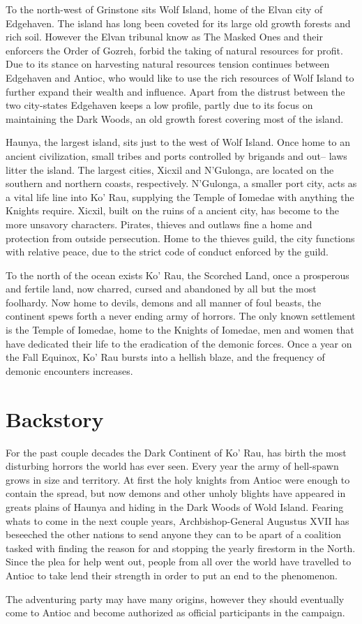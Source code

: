 To the north-west of Grinstone sits Wolf Island, home of the Elvan city of 
Edgehaven. The island has long been coveted for its large old growth forests and 
rich soil.  However the Elvan tribunal know as The Masked Ones and their enforcers
the Order of Gozreh, forbid the taking of natural resources for profit.  Due to
its stance on harvesting natural resources tension continues between Edgehaven and 
Antioc, who would like to use the rich resources of Wolf Island to further expand
their wealth and influence.  Apart from the distrust between the two city-states
Edgehaven keeps a low profile, partly due to its focus on maintaining the Dark 
Woods, an old growth forest covering most of the island.

Haunya, the largest island, sits just to the west of Wolf Island.  Once home to
an ancient civilization, small tribes and ports controlled by brigands and out--
laws litter the island.  The largest cities, Xicxil and N'Gulonga, are located on
the southern and northern coasts, respectively.  N'Gulonga, a smaller port city,
acts as a vital life line into Ko' Rau, supplying the Temple of Iomedae with anything
the Knights require.  Xicxil, built on the ruins of a ancient city, has become
to the more unsavory characters.  Pirates, thieves and outlaws fine a home and
protection from outside persecution.  Home to the thieves guild, the city functions
with relative peace, due to the strict code of conduct enforced by the guild.

To the north of the ocean exists Ko' Rau, the Scorched Land, once a prosperous and 
fertile land, now charred, cursed and abandoned by all but the most foolhardy.  Now
home to devils, demons and all manner of foul beasts, the continent spews forth 
a never ending army of horrors.  The only known settlement is the Temple of Iomedae,
home to the Knights of Iomedae, men and women that have dedicated their life to 
the eradication of the demonic forces.  Once a year on the Fall Equinox, Ko' Rau 
bursts into a hellish blaze, and the frequency of demonic encounters increases.

\section{Backstory}

For the past couple decades the Dark Continent of Ko' Rau, has birth the most
disturbing horrors the world has ever seen.  Every year the army of hell-spawn
grows in size and territory.  At first the holy knights from Antioc were enough
to contain the spread, but now demons and other unholy blights have appeared in 
greats plains of Haunya and hiding in the Dark Woods of Wold Island.  Fearing 
whats to come in the next couple years, Archbishop-General Augustus XVII has 
beseeched the other nations to send anyone they can to be apart of a coalition 
tasked with finding the reason for and stopping the yearly firestorm in the North.
Since the plea for help went out, people from all over the world have travelled 
to Antioc to take lend their strength in order to put an end to the phenomenon.

The adventuring party may have many origins, however they should eventually 
come to Antioc and become authorized as official participants in the campaign.


